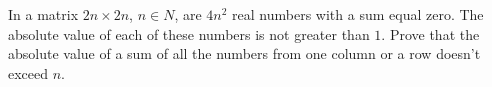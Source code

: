 In a matrix $2n \times 2n$, $n \in N$, are $4n^2$ real numbers with a sum equal zero. The absolute value of each of these numbers is not greater than $1$. Prove that the absolute value of a sum of all the numbers from one column or a row doesn't exceed $n$.